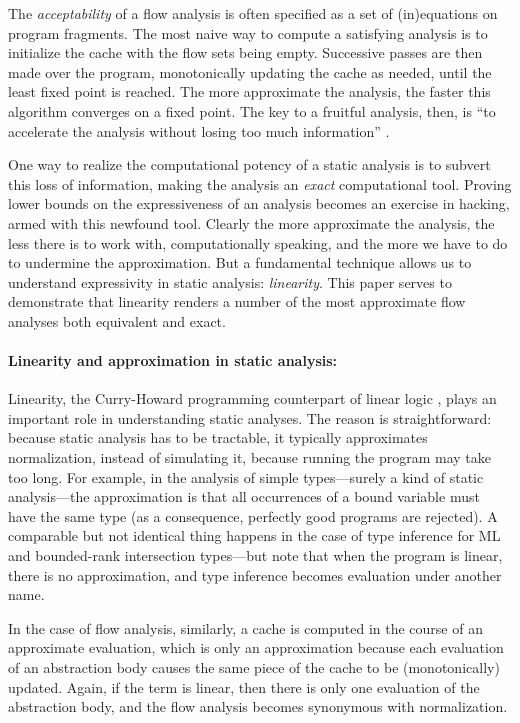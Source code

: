 \documentclass{llncs}
\begin{document}
The {\em acceptability} of a flow analysis is often specified as a set
of (in)equations on program fragments.  The most naive way to compute
a satisfying analysis is to initialize the cache with the flow sets
being empty.  Successive passes are then made over the program,
monotonically updating the cache as needed, until the least fixed
point is reached.  The more approximate the analysis, the faster this
algorithm converges on a fixed point.  The key to a fruitful analysis,
then, is ``to accelerate the analysis without losing too much
information'' \cite{ashley-dybvig}.

One way to realize the computational potency of a static analysis is
to subvert this loss of information, making the analysis an {\em
exact} computational tool.  Proving lower bounds on the expressiveness
of an analysis becomes an exercise in hacking, armed with this
newfound tool.  Clearly the more approximate the analysis, the less
there is to work with, computationally speaking, and the more we have
to do to undermine the approximation.  But a fundamental technique
allows us to understand expressivity in static analysis: {\em
linearity}.  This paper serves to demonstrate that linearity renders a
number of the most approximate flow analyses both equivalent and
exact.

\paragraph{Linearity and approximation in static analysis:}

Linearity, the Curry-Howard programming counterpart of linear logic
\cite{girard-ll}, plays an important role in understanding static
analyses.  The reason is straightforward: because static analysis has
to be tractable, it typically approximates normalization, instead of
simulating it, because running the program may take too long.  For
example, in the analysis of simple types---surely a kind of static
analysis---the approximation is that all occurrences of a bound
variable must have the same type (as a consequence, perfectly good
programs are rejected).  A comparable but not identical thing happens
in the case of type inference for ML and bounded-rank intersection
types---but note that when the program is linear, there is no
approximation, and type inference becomes evaluation under another
name.

In the case of flow analysis, similarly, a cache is computed in the
course of an approximate evaluation, which is only an approximation
because each evaluation of an abstraction body causes the same piece
of the cache to be (monotonically) updated.  Again, if the term is
linear, then there is only one evaluation of the abstraction body, and
the flow analysis becomes synonymous with normalization.
\end{document}
